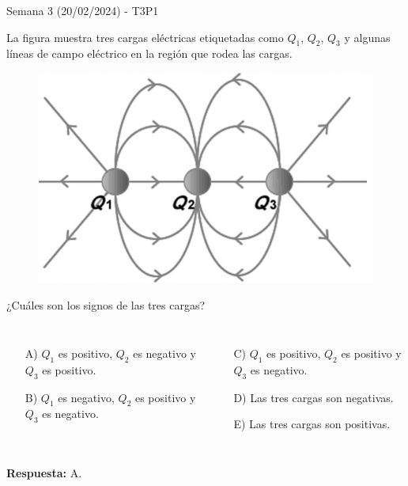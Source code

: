 \begin{frame}{Semana 3 (20/02/2024) - T3P1}

    La figura muestra tres cargas eléctricas etiquetadas como $Q_1$, $Q_2$, $Q_3$ y algunas líneas de campo eléctrico en la región que rodea las cargas.
    
    \begin{figure}[H]
        \centering
        \includegraphics[scale=0.2]{figures/t3p1.png}
    \end{figure}
    
    ¿Cuáles son los signos de las tres cargas?
    
    \begin{columns}
    \begin{itemize}
        \item[A)] $Q_1$ es positivo, $Q_2$ es negativo y $Q_3$ es positivo.
        \item[B)] $Q_1$ es negativo, $Q_2$ es positivo y $Q_3$ es negativo.
    \end{itemize}
    \begin{itemize}
        \item[C)] $Q_1$ es positivo, $Q_2$ es positivo y $Q_3$ es negativo.
        \item[D)] Las tres cargas son negativas.
        \item[E)] Las tres cargas son positivas.
    \end{itemize}
    
    \end{columns}
    
    \pause\bigskip\centering\textbf{Respuesta:} A.
    
\end{frame}

